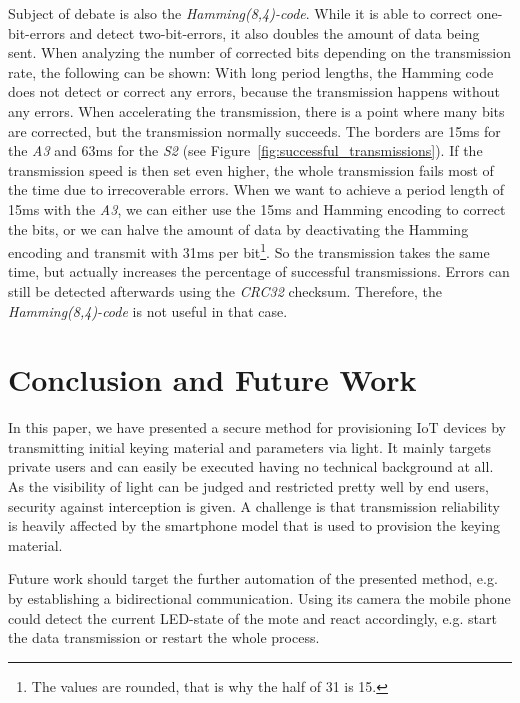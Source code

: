 \documentclass{ewsn-proc} %
\begin{document}
Subject of debate is also the \textit{Hamming(8,4)-code}.
While it is able to correct one-bit-errors and detect two-bit-errors, it also doubles the amount of data being sent.
When analyzing the number of corrected bits depending on the transmission rate, the following can be shown:
With long period lengths, the Hamming code does not detect or correct any errors, because the transmission happens without any errors.
When accelerating the transmission, there is a point where many bits are corrected, but the transmission normally succeeds.
The borders are 15ms for the \textit{A3} and 63ms for the \textit{S2} (see Figure~\ref{fig:successful_transmissions}).
If the transmission speed is then set even higher, the whole transmission fails most of the time due to irrecoverable errors.
When we want to achieve a period length of 15ms with the \textit{A3}, we can either use the 15ms and Hamming encoding to correct the bits, or we can halve the amount of data by deactivating the Hamming encoding and transmit with 31ms per bit\footnote{The values are rounded, that is why the half of 31 is 15.}.
So the transmission takes the same time, but actually increases the percentage of successful transmissions.
Errors can still be detected afterwards using the \textit{CRC32} checksum.
Therefore, the \textit{Hamming(8,4)-code} is not useful in that case.



\section{Conclusion and Future Work}
\label{sec:future_work}

In this paper, we have presented a secure method for provisioning IoT devices by transmitting initial keying material and parameters via light.
It mainly targets private users and can easily be executed having no technical background at all.
As the visibility of light can be judged and restricted pretty well by end users, security against interception is given.
A challenge is that transmission reliability is heavily affected by the smartphone model that is used to provision the keying material.

Future work should target the further automation of the presented method, e.g. by establishing a bidirectional communication.
Using its camera the mobile phone could detect the current LED-state of the mote and react accordingly, e.g. start the data transmission or restart the whole process.
\end{document}
